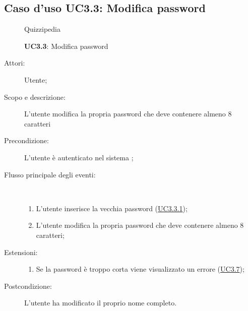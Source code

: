 \subsection{Caso d'uso UC3.3: Modifica password}
	\begin{figure}[H]
		\centering
		\begin{resizedtikzpicture}{\textwidth}
		\begin{umlsystem}[x=0, fill=lightgray!20]{Quizzipedia}
		\end{umlsystem}
		\end{resizedtikzpicture}
		\caption{\textbf{UC3.3}: Modifica password}
		\label{UC3.3}
	\end{figure}
\begin{description}
\item[Attori:] Utente;
\item[Scopo e descrizione:] L'utente modifica la propria password che deve contenere almeno 8 caratteri
      \item[Precondizione:] L'utente è autenticato nel sistema
;

        \item[Flusso principale degli eventi:] \ 
 \begin{enumerate}
          \item L'utente inserisce la vecchia password (\hyperlink{UC3.3.1}{UC3.3.1});
          \item L'utente modifica la propria password che deve contenere almeno 8 caratteri;

      \end{enumerate}
    \item[Estensioni:]
      \begin{enumerate}
          \item Se la password è troppo corta viene visualizzato un errore	 (\hyperlink{UC3.7}{UC3.7});

      \end{enumerate}
    \item[Postcondizione:] L'utente ha modificato il proprio nome completo.
  \end{description}
\hypertarget{UC3.3.1}{}
